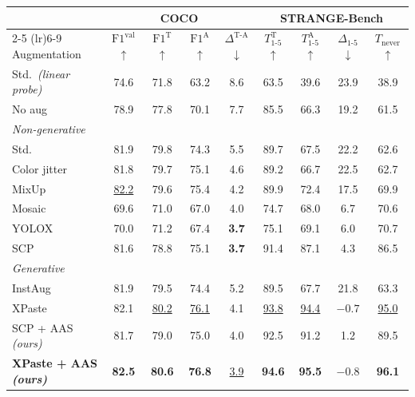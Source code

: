 \begin{tabular}{l cccc cccc}
\toprule
& \multicolumn{4}{c}{\textbf{COCO}} & \multicolumn{4}{c}{\textbf{STRANGE-Bench}} \\
\cmidrule(lr){2-5} \cmidrule(lr){6-9}
Augmentation & $\text{F1}^{\text{val}}$ $\uparrow$ & $\text{F1}^{\text{T}}$ $\uparrow$ & $\text{F1}^{\text{A}}$ $\uparrow$ & $\Delta^{\text{T-A}}$ $\downarrow$ & $T_{1\text{-}5}^{\text{T}}$ $\uparrow$ & $T_{1\text{-}5}^{\text{A}}$ $\uparrow$ & $\Delta_{1\text{-}5}$ $\downarrow$ & $T_{\text{never}}$ $\uparrow$ \\
\midrule
Std.\ \emph{(linear probe)} & 74.6 & 71.8 & 63.2 & 8.6 & 63.5 & 39.6 & 23.9 & 38.9 \\
\midrule
No aug & 78.9 & 77.8 & 70.1 & 7.7 & 85.5 & 66.3 & 19.2 & 61.5 \\
\midrule
\multicolumn{9}{l}{\emph{Non-generative}} \\
Std. & 81.9 & 79.8 & 74.3 & 5.5 & 89.7 & 67.5 & 22.2 & 62.6 \\
Color jitter & 81.8 & 79.7 & 75.1 & 4.6 & 89.2 & 66.7 & 22.5 & 62.7 \\
MixUp & \underline{82.2} & 79.6 & 75.4 & 4.2 & 89.9 & 72.4 & 17.5 & 69.9 \\
Mosaic & 69.6 & 71.0 & 67.0 & 4.0 & 74.7 & 68.0 & 6.7 & 70.6 \\
YOLOX & 70.0 & 71.2 & 67.4 & \textbf{3.7} & 75.1 & 69.1 & 6.0 & 70.7 \\
SCP & 81.6 & 78.8 & 75.1 & \textbf{3.7} & 91.4 & 87.1 & 4.3 & 86.5 \\
\midrule
\multicolumn{9}{l}{\emph{Generative}} \\
InstAug & 81.9 & 79.5 & 74.4 & 5.2 & 89.5 & 67.7 & 21.8 & 63.3 \\
XPaste & 82.1 & \underline{80.2} & \underline{76.1} & 4.1 & \underline{93.8} & \underline{94.4} & \underline{$-0.7$} & \underline{95.0} \\
\midrule
\rowcolor{oursrow} SCP + AAS \emph{(ours)} & 81.7 & 79.0 & 75.0 & 4.0 & 92.5 & 91.2 & 1.2 & 89.5 \\
\rowcolor{oursrow} \textbf{XPaste + AAS \emph{(ours)}} & \textbf{82.5} & \textbf{80.6} & \textbf{76.8} & \underline{3.9} & \textbf{94.6} & \textbf{95.5} & \textbf{\boldmath $-0.8$} & \textbf{96.1} \\
\bottomrule
\end{tabular}
